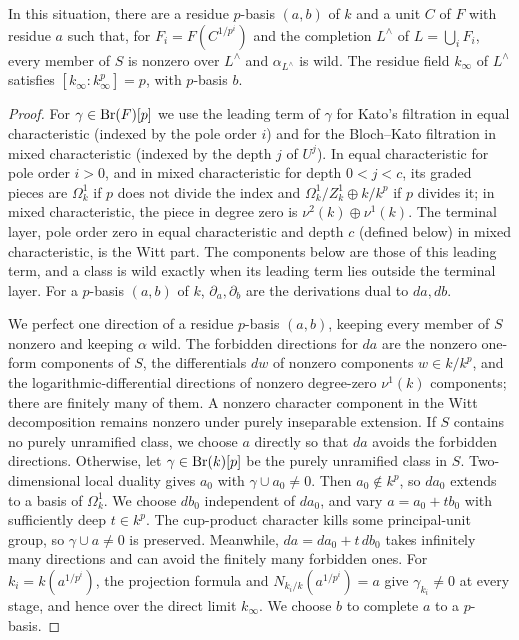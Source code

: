 \begin{lemma}\label{lem:second-three-lambda}
In this situation, there are a residue $p$-basis $(a,b)$ of $k$ and a unit $C$ of $F$ with residue $a$ such that, for $F_i=F(C^{1/p^i})$ and the completion $L^\wedge$ of $L=\bigcup_iF_i$, every member of $S$ is nonzero over $L^\wedge$ and $\alpha_{L^\wedge}$ is wild.
The residue field $k_\infty$ of $L^\wedge$ satisfies $[k_\infty:k_\infty^p]=p$, with $p$-basis $b$.
\end{lemma}
\begin{proof}
For $\gamma\in\operatorname{Br}(F)[p]$ we use the leading term of $\gamma$ for Kato's filtration in equal characteristic (indexed by the pole order $i$) and for the Bloch--Kato filtration in mixed characteristic (indexed by the depth $j$ of $U^j$).
In equal characteristic for pole order $i>0$, and in mixed characteristic for depth $0<j<c$, its graded pieces are $\Omega^1_k$ if $p$ does not divide the index and $\Omega^1_k/Z^1_k\oplus k/k^p$ if $p$ divides it; in mixed characteristic, the piece in degree zero is $\nu^2(k)\oplus\nu^1(k)$.
The terminal layer, pole order zero in equal characteristic and depth $c$ (defined below) in mixed characteristic, is the Witt part.
The components below are those of this leading term, and a class is wild exactly when its leading term lies outside the terminal layer.
For a $p$-basis $(a,b)$ of $k$, $\partial_a,\partial_b$ are the derivations dual to $da,db$.

We perfect one direction of a residue $p$-basis $(a,b)$, keeping every member of $S$ nonzero and keeping $\alpha$ wild.
The forbidden directions for $da$ are the nonzero one-form components of $S$, the differentials $dw$ of nonzero components $w\in k/k^p$, and the logarithmic-differential directions of nonzero degree-zero $\nu^1(k)$ components; there are finitely many of them.
A nonzero character component in the Witt decomposition remains nonzero under purely inseparable extension.
If $S$ contains no purely unramified class, we choose $a$ directly so that $da$ avoids the forbidden directions.
Otherwise, let $\gamma\in\operatorname{Br}(k)[p]$ be the purely unramified class in $S$.
Two-dimensional local duality gives $a_0$ with $\gamma\cup a_0\ne0$.
Then $a_0\notin k^p$, so $da_0$ extends to a basis of $\Omega^1_k$.
We choose $db_0$ independent of $da_0$, and vary $a=a_0+t b_0$ with sufficiently deep $t\in k^p$.
The cup-product character kills some principal-unit group, so $\gamma\cup a\ne0$ is preserved.
Meanwhile, $da=da_0+t\,db_0$ takes infinitely many directions and can avoid the finitely many forbidden ones.
For $k_i=k(a^{1/p^i})$, the projection formula and $N_{k_i/k}(a^{1/p^i})=a$ give $\gamma_{k_i}\ne0$ at every stage, and hence over the direct limit $k_\infty$.
We choose $b$ to complete $a$ to a $p$-basis.


\end{proof}
